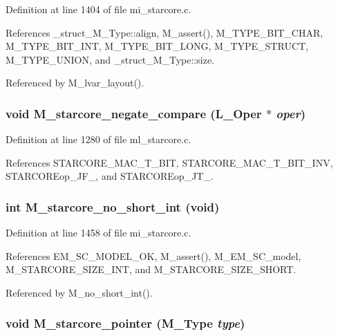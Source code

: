 Definition at line 1404 of file mi\_\-starcore.c.

References \_\-struct\_\-M\_\-Type::align, M\_\-assert(), M\_\-TYPE\_\-BIT\_\-CHAR, M\_\-TYPE\_\-BIT\_\-INT, M\_\-TYPE\_\-BIT\_\-LONG, M\_\-TYPE\_\-STRUCT, M\_\-TYPE\_\-UNION, and \_\-struct\_\-M\_\-Type::size.

Referenced by M\_\-lvar\_\-layout().
\subsubsection{\setlength{\rightskip}{0pt plus 5cm}void M\_\-starcore\_\-negate\_\-compare (L\_\-Oper $\ast$ {\em oper})}\label{m__starcore_8h_54c4df5ae7044369fdc37a27f40d89fa}




Definition at line 1280 of file ml\_\-starcore.c.

References STARCORE\_\-MAC\_\-T\_\-BIT, STARCORE\_\-MAC\_\-T\_\-BIT\_\-INV, STARCOREop\_\-JF\_, and STARCOREop\_\-JT\_.
\subsubsection{\setlength{\rightskip}{0pt plus 5cm}int M\_\-starcore\_\-no\_\-short\_\-int (void)}\label{m__starcore_8h_d91b738f726df4e1941e8be47710af0d}




Definition at line 1458 of file mi\_\-starcore.c.

References EM\_\-SC\_\-MODEL\_\-OK, M\_\-assert(), M\_\-EM\_\-SC\_\-model, M\_\-STARCORE\_\-SIZE\_\-INT, and M\_\-STARCORE\_\-SIZE\_\-SHORT.

Referenced by M\_\-no\_\-short\_\-int().
\subsubsection{\setlength{\rightskip}{0pt plus 5cm}void M\_\-starcore\_\-pointer (\bf{M\_\-Type} {\em type})}\label{m__starcore_8h_f7bbc6a04c383761e32b8a4f6211ecc6}




